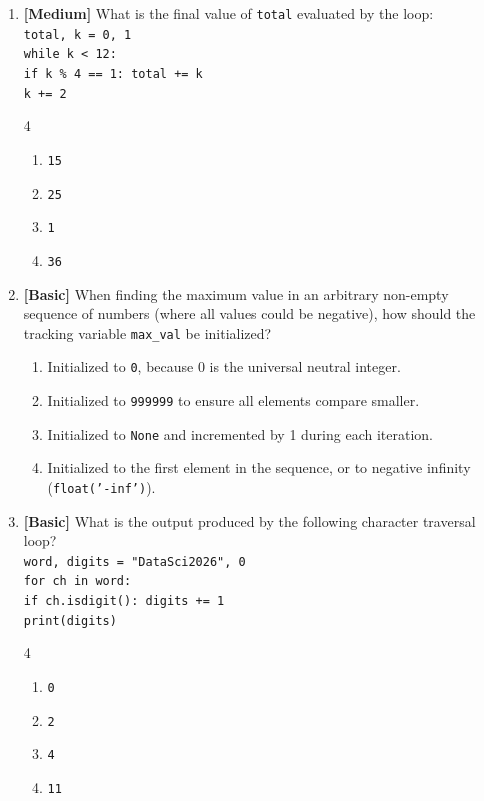 \documentclass[11pt,a4paper]{article}
\begin{document}
\newpage


\begin{enumerate}[label=\textbf{Q\arabic*.},leftmargin=1.8em,itemsep=0.8pt,topsep=0.3pt,resume]

\item \textbf{[Medium]} What is the final value of \texttt{total} evaluated by the loop:\\
\texttt{total, k = 0, 1}\\
\texttt{while k < 12:}\\
\texttt{\phantom{XX}if k \% 4 == 1: total += k}\\
\texttt{\phantom{XX}k += 2}
\begin{multicols}{4}
\begin{enumerate}[label=\Alph*.]
  \item \texttt{15}
  \item \texttt{25}
  \item \texttt{1}
  \item \texttt{36}
\end{enumerate}
\end{multicols}

\item \textbf{[Basic]} When finding the maximum value in an arbitrary non-empty sequence of numbers (where all values could be negative), how should the tracking variable \texttt{max\_val} be initialized?
\begin{enumerate}[label=\Alph*.,leftmargin=1.8em]
  \item Initialized to \texttt{0}, because 0 is the universal neutral integer.
  \item Initialized to \texttt{999999} to ensure all elements compare smaller.
  \item Initialized to \texttt{None} and incremented by 1 during each iteration.
  \item Initialized to the first element in the sequence, or to negative infinity (\texttt{float('-inf')}).
\end{enumerate}

\item \textbf{[Basic]} What is the output produced by the following character traversal loop?\\
\texttt{word, digits = "DataSci2026", 0}\\
\texttt{for ch in word:}\\
\texttt{\phantom{XX}if ch.isdigit(): digits += 1}\\
\texttt{print(digits)}
\begin{multicols}{4}
\begin{enumerate}[label=\Alph*.]
  \item \texttt{0}
  \item \texttt{2}
  \item \texttt{4}
  \item \texttt{11}
\end{enumerate}
\end{multicols}


\end{enumerate}
\end{document}
